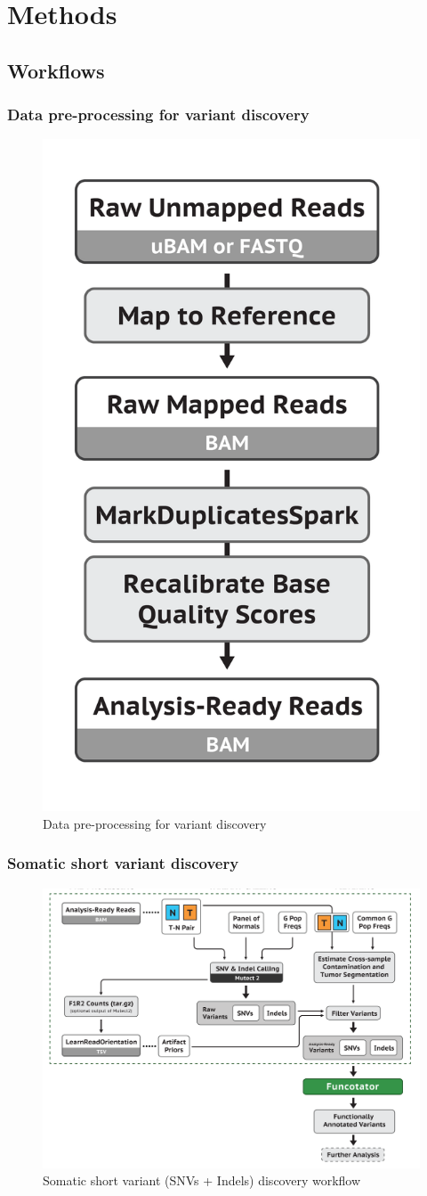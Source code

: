 \documentclass{beamer}
\begin{document}
    \section{Methods}
    \subsection{Workflows}
    \begin{frame}
        \frametitle{Data pre-processing for variant discovery}

        \begin{figure}
            \includegraphics[width=0.3 \linewidth]{figures/Workflow/mapping.png}
            \caption{Data pre-processing for variant discovery \protect\cite{gatk1, gatk2}}
        \end{figure}
    \end{frame}

    \begin{frame}
        \frametitle{Somatic short variant discovery}

        \begin{figure}
            \includegraphics[width=0.7 \linewidth]{figures/Workflow/somatic_short_variants.png}
            \caption{Somatic short variant (SNVs + Indels) discovery workflow \protect\cite{gatk1, gatk2}}
        \end{figure}
    \end{frame}
\end{document}
